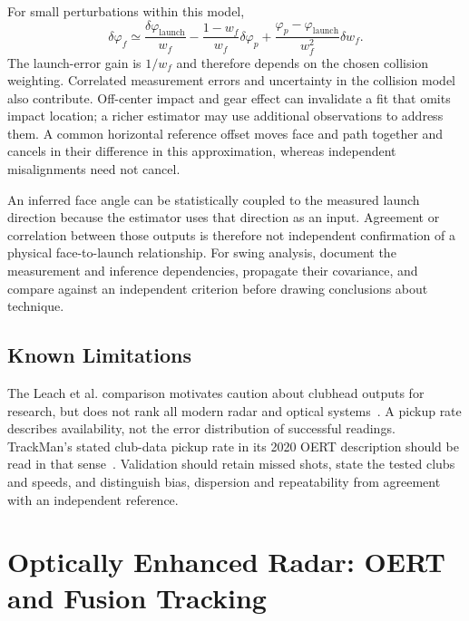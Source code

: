 For small perturbations within this model,
\begin{equation}
\label{eq:radarfaceerror}
\delta\varphi_f\simeq
\frac{\delta\varphi_{\mathrm{launch}}}{w_f}
-\frac{1-w_f}{w_f}\delta\varphi_p
+\frac{\varphi_p-\varphi_{\mathrm{launch}}}{w_f^2}\delta w_f.
\end{equation}
The launch-error gain is $1/w_f$ and therefore depends on the chosen collision weighting.
Correlated measurement errors and uncertainty in the collision model also contribute.
Off-center impact and gear effect can invalidate a fit that omits impact location; a richer estimator may use additional observations to address them.
A common horizontal reference offset moves face and path together and cancels in their difference in this approximation, whereas independent misalignments need not cancel.

\begin{keypoint}
An inferred face angle can be statistically coupled to the measured launch direction because the estimator uses that direction as an input.
Agreement or correlation between those outputs is therefore not independent confirmation of a physical face-to-launch relationship.
For swing analysis, document the measurement and inference dependencies, propagate their covariance, and compare against an independent criterion before drawing conclusions about technique.
\end{keypoint}

\subsection{Known Limitations}

The Leach et al. comparison motivates caution about clubhead outputs for research, but does not rank all modern radar and optical systems~\cite{leach2017}.
A pickup rate describes availability, not the error distribution of successful readings.
TrackMan's stated club-data pickup rate in its 2020 OERT description should be read in that sense~\cite{trackmanoert}.
Validation should retain missed shots, state the tested clubs and speeds, and distinguish bias, dispersion and repeatability from agreement with an independent reference.

\section{Optically Enhanced Radar: OERT and Fusion Tracking}
\label{sec:oert}

